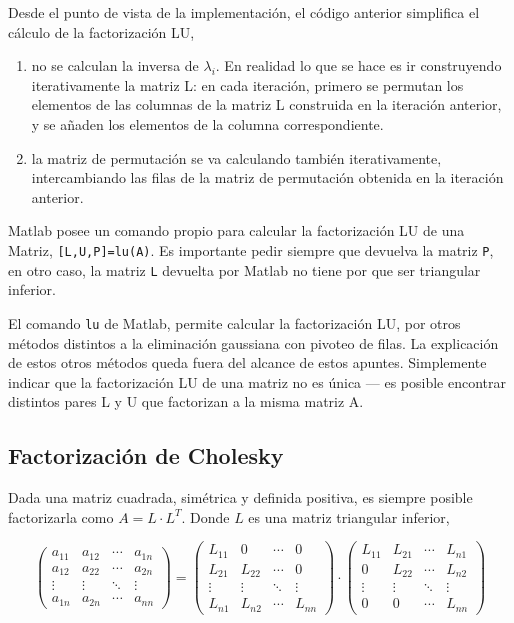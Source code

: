 Desde el punto de vista de la implementación, el código anterior simplifica el cálculo de la factorización LU,

\begin{enumerate}
\item  no se calculan la inversa de $\lambda_i$. En realidad lo que se hace es ir construyendo iterativamente la matriz L: en cada iteración, primero se permutan los elementos de las columnas de la matriz L construida en la iteración anterior, y se añaden los elementos de la columna correspondiente.
\item la matriz de permutación se va calculando también iterativamente, intercambiando las filas de la matriz de permutación obtenida en la iteración anterior.
\end{enumerate}

Matlab posee un comando propio para calcular la factorización LU de una Matriz, \texttt{[L,U,P]=lu(A)}. Es importante pedir siempre que devuelva la matriz \texttt{P}, en otro caso, la matriz \texttt{L} devuelta por Matlab no tiene por que ser triangular inferior. 

El comando \texttt{lu} de Matlab, permite calcular la factorización LU, por otros métodos distintos a la eliminación gaussiana con pivoteo de filas. La explicación de estos otros métodos queda fuera del alcance de estos apuntes. Simplemente indicar que la factorización LU de una matriz no es única --- es posible encontrar distintos pares L y U que factorizan a la misma matriz A.

\subsection{Factorización de Cholesky}\label{chol}
Dada una matriz cuadrada, simétrica y definida positiva, es siempre posible factorizarla como $A=L\cdot L^T$. Donde $L$ es una matriz triangular inferior,

\begin{equation*}
\begin{pmatrix}
a_{11}& a_{12}& \cdots & a_{1n}\\
a_{12}& a_{22}& \cdots & a_{2n}\\
\vdots & \vdots & \ddots & \vdots\\
a_{1n}& a_{2n}& \cdots & a_{nn}
\end{pmatrix}=\begin{pmatrix}
L_{11}& 0& \cdots & 0\\
L_{21}& L_{22}& \cdots & 0\\
\vdots & \vdots & \ddots & \vdots\\
L_{n1}& L_{n2}& \cdots & L_{nn}
\end{pmatrix} \cdot \begin{pmatrix}
L_{11}& L_{21}& \cdots & L_{n1}\\
0& L_{22}& \cdots & L_{n2}\\
\vdots & \vdots & \ddots & \vdots\\
0& 0& \cdots & L_{nn}
\end{pmatrix}
\end{equation*}

